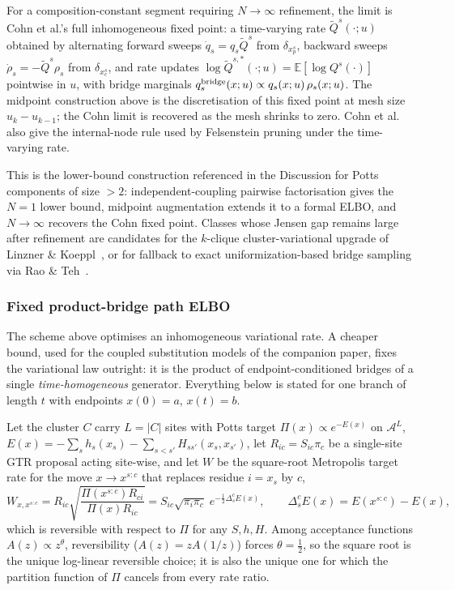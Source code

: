 \begin{remark}
For a composition-constant segment requiring $N \to \infty$ refinement,
the limit is Cohn et al.'s full inhomogeneous fixed point: a
time-varying rate $\tilde Q^s(\cdot; u)$ obtained by alternating
forward sweeps $\dot q_s = q_s \tilde Q^s$ from $\delta_{x_p^s}$,
backward sweeps $\dot \rho_s = -\tilde Q^s \rho_s$ from
$\delta_{x_c^s}$, and rate updates
$\log \tilde Q^{s,*}(\cdot; u) = \mathbb{E}[\log Q^s(\cdot)]$
pointwise in $u$, with bridge marginals
$q^{\rm bridge}_s(x; u) \propto q_s(x; u)\, \rho_s(x; u)$.
The midpoint construction above is the discretisation of this
fixed point at mesh size $u_k - u_{k-1}$; the Cohn limit is recovered
as the mesh shrinks to zero. Cohn et al.~\citep[\S 7]{cohn2010}
also give the internal-node rule used by Felsenstein pruning under
the time-varying rate.
\end{remark}

This is the lower-bound construction referenced in the Discussion for
Potts components of size $> 2$: independent-coupling pairwise factorisation
gives the $N{=}1$ lower bound, midpoint augmentation extends it to a
formal ELBO, and $N \to \infty$ recovers the Cohn fixed point.
Classes whose Jensen gap remains large after refinement are
candidates for the $k$-clique cluster-variational upgrade of
Linzner \& Koeppl~\citep{linznerkoeppl2018}, or for fallback to
exact uniformization-based bridge sampling via Rao \&
Teh~\citep{raoteh2013}.

\subsubsection*{Fixed product-bridge path ELBO}
\label{sec:fixed-bridge-elbo}

The scheme above optimises an inhomogeneous variational rate. A cheaper
bound, used for the coupled substitution models of the companion paper,
fixes the variational law outright: it is the product of endpoint-conditioned
bridges of a single \emph{time-homogeneous} generator. Everything below is
stated for one branch of length $t$ with endpoints $x(0)=a$, $x(t)=b$.

Let the cluster $C$ carry $L = |C|$ sites with Potts target
$\Pi(x) \propto e^{-E(x)}$ on $\mathcal{A}^L$,
$E(x) = -\sum_s h_s(x_s) - \sum_{s<s'} H_{ss'}(x_s, x_{s'})$, let
$R_{ic} = S_{ic}\pi_c$ be a single-site GTR proposal acting site-wise, and let
$W$ be the square-root Metropolis target rate for the move $x \to x^{s:c}$
that replaces residue $i = x_s$ by $c$,
\[
    W_{x, x^{s:c}}
    = R_{ic}\sqrt{\frac{\Pi(x^{s:c})R_{ci}}{\Pi(x)R_{ic}}}
    = S_{ic}\sqrt{\pi_i \pi_c}\; e^{-\frac12 \Delta^c_s E(x)},
    \qquad
    \Delta^c_s E(x) = E(x^{s:c}) - E(x),
\]
which is reversible with respect to $\Pi$ for any $S, h, H$. Among acceptance
functions $A(z) \propto z^\theta$, reversibility ($A(z) = z A(1/z)$) forces
$\theta = \tfrac12$, so the square root is the unique log-linear reversible
choice; it is also the unique one for which the partition function of $\Pi$
cancels from every rate ratio.

